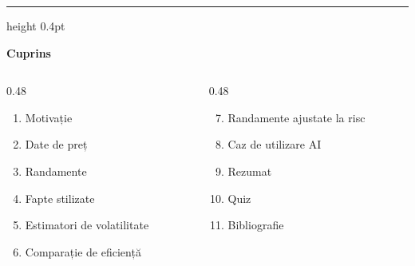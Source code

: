 \documentclass[9pt, aspectratio=169, t]{beamer}
\theoremstyle{definition}
\begin{document}
{
\begin{frame}{}
    {\color{FooterGray}\hrule height 0.4pt}
    \vspace{0.1cm}
    {\Large\textcolor{IDAred}{\textbf{Cuprins}}}
    \vspace{0.2cm}
    {\small
    \begin{columns}[T]
        \begin{column}{0.48\textwidth}
            \begin{enumerate}
                \item Motivație
                \item Date de preț
                \item Randamente
                \item Fapte stilizate
                \item Estimatori de volatilitate
                \item Comparație de eficiență
            \end{enumerate}
        \end{column}
        \begin{column}{0.48\textwidth}
            \begin{enumerate}\setcounter{enumi}{6}
                \item Randamente ajustate la risc
                \item Caz de utilizare AI
                \item Rezumat
                \item Quiz
                \item Bibliografie
            \end{enumerate}
        \end{column}
    \end{columns}
    }
\end{frame}
}
\end{document}
